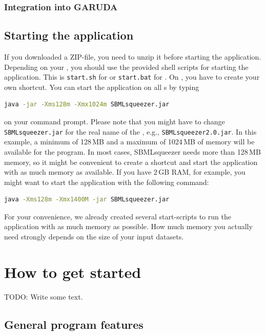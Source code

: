 \subsection{Integration into GARUDA}

\section{Starting the application}
\label{startingTheProgram}

If you downloaded a ZIP-file, you need to unzip it before starting the
application. Depending on your \OS, you should use the provided
shell scripts for starting the application. This is \texttt{start.sh} for \Linux
or \texttt{start.bat} for \Windows. On \MacOSX, you have to create your own
shortcut. You can start the application on all {\OS}s by typing

\begin{lstlisting}[language=bash,numbers=none]
java -jar -Xms128m -Xmx1024m SBMLsqueezer.jar
\end{lstlisting}

\noindent on your command prompt. Please note that you might have to change
\texttt{SBMLsqueezer.jar} for the real name of the \JAR, e.g.,
\texttt{SBMLsqueezer2.0.jar}. In this example, a minimum of 128\,MB and a maximum
of 1024\,MB of memory will be available for the program. In most cases,
SBMLsqueezer needs more than 128\,MB memory, so it might be convenient to create a
shortcut and start the application with as much memory as available. If you
have 2\,GB RAM, for example, you might want to start the application with the
following command:

\begin{lstlisting}[language=bash,numbers=none]
java -Xms128m -Xmx1400M -jar SBMLsqueezer.jar
\end{lstlisting}

For your convenience, we already created several start-scripts to run the
application with as much memory as possible. How much memory you actually need
strongly depends on the size of your input datasets.
%

\chapter{How to get started}

TODO: Write some text.

\section{General program features}

